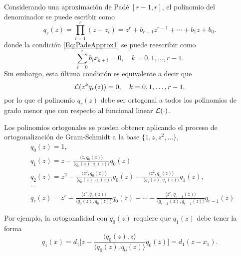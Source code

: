         	Considerando una aproximación de Padé $[r-1,r]$, el polinomio del denominador se puede escribir como
        	\begin{equation} q_r(z) = \prod_{i=1}^r(z-z_i) = z^r + b_{r-1}z^{r-1} + \cdots + b_1z + b_0. \label{Eq:Polynomial}\end{equation}
        	donde la condición \eqref{Eq:PadeApprox1} se puede reescribir como
        	\begin{equation}
        	\sum_{i=0}^r b_ix_{k+i}=0, \quad k = 0,1,\ldots,r-1.
        	\label{Eq:OrthPolynomial1}
        	\end{equation}
        	Sin embargo, esta última condición es equivalente a decir que
        	\begin{equation}
        		\mathcal{L}(z^kq_{r}(z)) = 0, \quad k = 0,1,\ldots,r-1.
        		\label{Eq:OrthoPolynomial2}
        	\end{equation}
        	por lo que el polinomio $q_r(z)$ debe ser ortogonal a todos los polinomios de grado menor que con respecto al funcional linear $\mathcal{L}(\cdot)$.
        	
        	Los polinomios ortogonales se pueden obtener aplicando el proceso de ortogonalización de Gram-Schmidt a la base $\big\{1,z,z^2,\ldots\big\}$,
        	\[\begin{aligned}
        	& q_0(z) = 1,\\[0.3em]
        	& q_1(z) = z - \frac{\langle z,q_0(z)\rangle}{\langle q_0(z),q_0(z)\rangle}q_0(z)\\[0.3em]
        	& q_2(z) = z^2 -  \frac{\langle z^2,q_0(z)\rangle}{\langle q_0(z),q_0(z)\rangle}q_0(z) - \frac{\langle z^2,q_1(z)\rangle}{\langle q_1(z),q_1(z)\rangle}q_1(z),\\[0.3em]
        	& \cdots\\[0.3em]
        	&  q_r(z) = z^r - \frac{\langle z^r,q_0(z)\rangle}{\langle q_0(z),q_0(z)\rangle}q_0(z) - \cdots - \frac{\langle z^r,q_{r-1}(z)\rangle}{\langle q_{r-1}(z),q_{r-1}(z)\rangle}q_{r-1}(z)
        	\end{aligned}\]
        	
        	Por ejemplo, la ortogonalidad con $q_0(z)$ requiere que $q_1(z)$ debe tener la forma
        	\[q_1(x) = d_1\bigg[z-\frac{\langle q_0(z),z\rangle}{\langle q_0(z),q_0(z)\rangle}q_0(z)\bigg] = d_1(z-x_1).\]
        	
